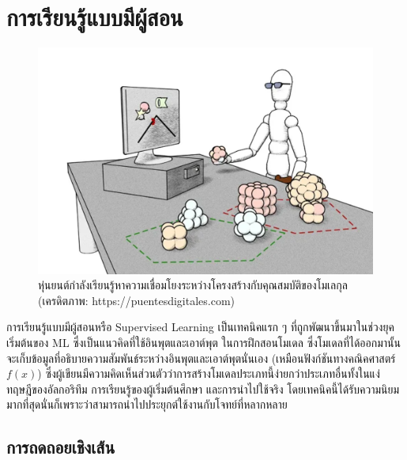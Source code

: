 

\chapter{การเรียนรู้แบบมีผู้สอน}
\label{ch:sup_ml}

\begin{figure}[htbp]
    \centering
    \includegraphics[width=0.9\linewidth]{fig/supervised_ml.png}
    \caption{หุ่นยนต์กำลังเรียนรู้หาความเชื่อมโยงระหว่างโครงสร้างกับคุณสมบัติของโมเลกุล (เครดิตภาพ: https://puentesdigitales.com)}
    \label{fig:supervised_ml}
\end{figure}

การเรียนรู้แบบมีผู้สอนหรือ Supervised Learning เป็นเทคนิคแรก ๆ ที่ถูกพัฒนาขึ้นมาในช่วงยุคเริ่มต้นของ ML ซึ่งเป็นแนวคิดที่ใช้อินพุตและเอาต์พุต%
ในการฝึกสอนโมเดล ซึ่งโมเดลที่ได้ออกมานั้นจะเก็บข้อมูลที่อธิบายความสัมพันธ์ระหว่างอินพุตและเอาต์พุตนั่นเอง (เหมือนฟังก์ชันทางคณิคศาสตร์ $f(x)$) 
ซึ่งผู้เขียนมีความคิดเห็นส่วนตัวว่าการสร้างโมเดลประเภทนี้ง่ายกว่าประเภทอื่นทั้งในแง่ทฤษฎีของอัลกอริทึม การเรียนรู้ของผู้เริ่มต้นศึกษา และการนำไปใช้จริง 
โดยเทคนิคนี้ได้รับความนิยมมากที่สุดนั่นก็เพราะว่าสามารถนำไปประยุกต์ใช้งานกับโจทย์ที่หลากหลาย

\section{การถดถอยเชิงเส้น}
\label{sec:lin_res}

